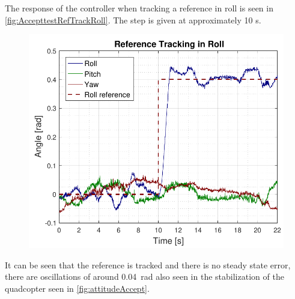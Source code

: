 The response of the controller when tracking a reference in roll is seen in \autoref{fig:AccepttestRefTrackRoll}. The step is given at approximately 10 s.
\begin{figure}[H]
	\includegraphics[scale=.7]{figures/AccepttestRefTrackRoll.pdf}
	\centering			
	\label{fig:AccepttestRefTrackRoll}
\end{figure}

It can be seen that the reference is tracked and there is no steady state error, there are oscillations of around \SI{0.04}{rad} also seen in the stabilization of the quadcopter seen in \autoref{fig:attitudeAccept}.



